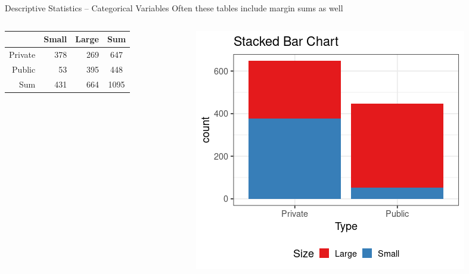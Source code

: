 \documentclass{beamer}
\begin{document}
\begin{frame}{Descriptive Statistics -- Categorical Variables}
Often these tables include margin sums as well
\vspace{2mm}

\begin{columns}

  \begin{column}{0.45\textwidth}
\begin{table}[ht]
\centering
\begin{tabular}{rrr|c}
  \hline
 & Small & Large & Sum \\ 
  \hline
Private & 378 & 269 & 647 \\ 
  Public & 53 & 395 & 448 \\ \hline 
  Sum & 431 & 664 & 1095 \\ 
   \hline
\end{tabular}
\end{table}
  \end{column}
  \begin{column}{0.45\textwidth}
\begin{center}
\includegraphics[scale=0.35]{bivariate_stack.png}
\end{center}
  \end{column}

\end{columns}
\end{frame}
\end{document}
